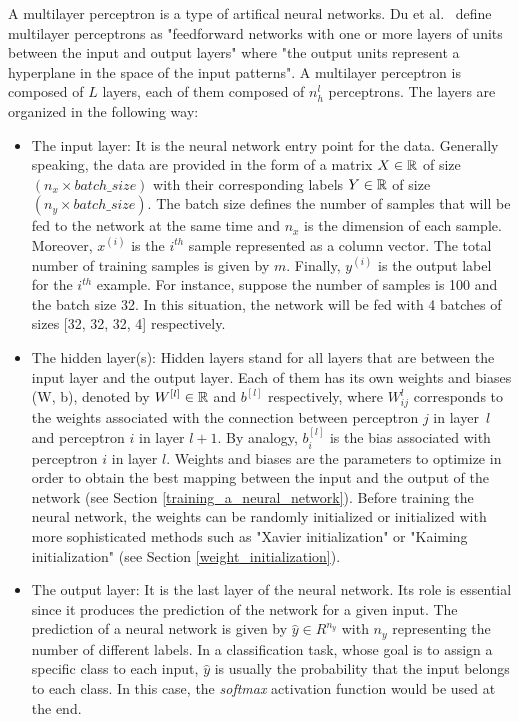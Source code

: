 \setlength{\marginparwidth}{3cm}\leavevmode {}A multilayer perceptron is a type of artifical neural networks. Du et al.~\cite{23} define multilayer perceptrons as "feedforward networks with one or more layers of units between the
input and output layers" where "the output units represent a hyperplane in the space
of the input patterns". A multilayer perceptron is composed of $L$ layers, each of them composed of $n^{l}_{h}$ perceptrons. The layers are organized in the following way:
\begin{itemize}
\item The input layer: It is the neural network entry point for the data. Generally speaking, the data are provided in the form of a matrix $X \in \mathbb{R}$ of size $(n_{x} \times batch\_size)$ with their corresponding labels $Y \in \mathbb{R}$ of size $(n_{y} \times batch\_size)$. The batch size defines the number of samples that will be fed to the network at the same time and $n_{x}$ is the dimension of each sample. Moreover, $x^{(i)}$ is the $i^{th}$ sample represented as a column vector. The total number of training samples is given by $m$. Finally, $y^{(i)}$ is the output label for the $i^{th}$ example. For instance, suppose the number of samples is 100 and the batch size 32. In this situation, the network will be fed with 4 batches of sizes [32, 32, 32, 4] respectively. 

\item The hidden layer(s): Hidden layers stand for all layers that are between the input layer and the output layer. Each of them has its own weights and biases (W, b), denoted by $W^{[l]} \in \mathbb{R} $ and $b^{[l]}$ respectively, where $W_{ij}^{l}$ corresponds to the weights associated with the connection between perceptron $j$ in \mbox{layer $l$} and perceptron $i$ in layer $l+1$. By analogy, $b_{i}^{[l]}$ is the bias associated with perceptron $i$ in layer $l$. Weights and biases are the parameters to optimize in order to obtain the best mapping between the input and the output of the network (see Section \ref{training_a_neural_network}). Before training the neural network, the weights can be randomly initialized or initialized with more sophisticated methods such as "Xavier initialization" or "Kaiming initialization" (see Section \ref{weight_initialization}).

\item The output layer: It is the last layer of the neural network. Its role is essential since it produces the prediction of the network for a given input. The prediction of a neural network is given by $\hat{y} \in R^{n_{y}}$ with $n_{y}$ representing the number of different labels. In a classification task, whose goal is to assign a specific class to each input, $\hat{y}$ is usually the probability that the input belongs to each class. In this case, the \textit{softmax} activation function would be used at the end.
\end{itemize}
